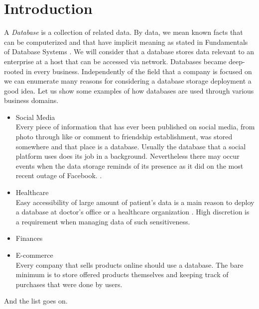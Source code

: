 \chapter{Introduction}

\par 
A \textit{Database} is a collection of related data. By data, we mean known facts that can be computerized and that have implicit meaning as stated in Fundamentals of Database Systems \cite{ElmasryNavathe15}. We will consider that a database stores data relevant to an enterprise at a host that can be accessed via network.
Databases became deep-rooted in every business. 
Independently of the field that a company is focused on we can enumerate many reasons for considering a database storage deployment a good idea.
Let us show some examples of how databases are used through various business domains.

\begin{itemize}
	
	\item Social Media \\
	Every piece of information that has ever been published on social media, from photo through like or comment to friendship establishment, was stored somewhere and that place is a database. Usually the database that a social platform uses does its job in a background. Nevertheless there may occur events when the data storage reminds of its presence as it did on the most recent outage of Facebook. \cite{Facebook19}.
	
	\item Healthcare \\
	Easy accessibility of large amount of patient's data is a main reason to deploy a database at doctor's office or a healthcare organization \cite{Healthcare13}. High discretion is a requirement when managing data of such sensitiveness.
	
	\item Finances \\
	
	\item E-commerce \\
	Every company that sells products online should use a database. The bare minimum is to store offered products themselves and keeping track of purchases that were done by users.
	
	
\end{itemize}
And the list goes on.
 \\

